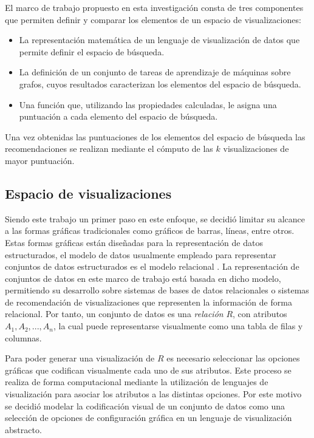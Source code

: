 El marco de trabajo propuesto en esta investigaci\'on consta de tres componentes que permiten definir y
comparar los elementos de un espacio de visualizaciones:

\begin{itemize}
    \item La representaci\'on matem\'atica de un lenguaje de visualizaci\'on de datos que permite 
    definir el espacio de b\'usqueda.
    \item La definici\'on de un conjunto de tareas de aprendizaje de m\'aquinas sobre grafos,
    cuyos resultados caracterizan los elementos del espacio de b\'usqueda.
    \item Una funci\'on que, utilizando las propiedades calculadas, le asigna una puntuaci\'on a
    cada elemento del espacio de b\'usqueda.
\end{itemize}

Una vez obtenidas las puntuaciones de los elementos del espacio de b\'usqueda las recomendaciones se realizan mediante el c\'omputo de las $k$ visualizaciones de mayor puntuaci\'on.

\subsection{Espacio de visualizaciones}\label{subsection:vis-space}

Siendo este trabajo un primer paso en este enfoque, se decidi\'o limitar su alcance
a las formas gr\'aficas tradicionales como gr\'aficos de barras, l\'ineas, entre otros. Estas formas
gr\'aficas est\'an dise\~nadas para la representaci\'on de datos estructurados, el modelo de 
datos usualmente empleado para representar conjuntos de datos estructurados es el modelo relacional \cite{codd1970relational}.
La representaci\'on de conjuntos de datos en este marco de trabajo est\'a basada en dicho modelo, permitiendo su
desarrollo sobre sistemas de bases de datos relacionales o sistemas de recomendaci\'on de visualizaciones que representen
la informaci\'on de forma relacional. Por tanto, un conjunto de datos es una \textit{relaci\'on} $R$, con atributos $A_1,A_2,...,A_n$, la cual puede representarse visualmente
como una tabla de filas y columnas.

Para poder generar una visualizaci\'on de $R$ es necesario
seleccionar las opciones gr\'aficas que codifican visualmente
cada uno de sus atributos. Este proceso se realiza de forma computacional mediante
la utilizaci\'on de lenguajes de visualizaci\'on para asociar los atributos a las distintas opciones.
Por este motivo se decidi\'o modelar la codificaci\'on visual de un conjunto de datos como 
una selecci\'on de opciones de configuraci\'on
gr\'afica en un lenguaje de visualizaci\'on abstracto.

